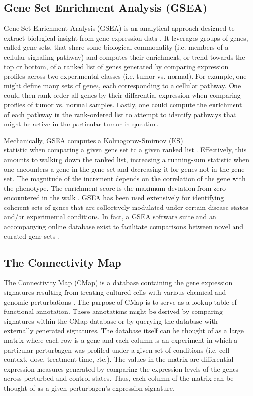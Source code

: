 \documentclass[12pt]{article}
\begin{document}
\subsection{Gene Set Enrichment Analysis (GSEA)}

Gene Set Enrichment Analysis (GSEA) is an analytical approach designed to extract biological insight from gene expression data \cite{subramanian_gene_2005}. It leverages  groups of genes, called gene sets, that share some biological commonality (i.e. members of a cellular signaling pathway) and computes their enrichment, or trend towards the top or bottom, of a ranked list of genes generated by comparing expression profiles across two experimental classes (i.e. tumor vs. normal). For example, one might define many sets of genes, each corresponding to a cellular pathway. One could then rank-order all genes by their differential expression when comparing profiles of tumor vs. normal samples. Lastly, one could compute the enrichment of each pathway in the rank-ordered list to attempt to identify pathways that might be active in the particular tumor in question.

Mechanically, GSEA computes a Kolmogorov-Smirnov (KS)\\
 statistic when comparing a given gene set to a given ranked list \cite{hollander_wolfe_1975}. Effectively, this amounts to walking down the ranked list, increasing a running-sum statistic when one encounters a gene in the gene set and decreasing it for genes not in the gene set. The magnitude of the increment depends on the correlation of the gene with the phenotype. The enrichment score is the maximum deviation from zero encountered in the walk \cite{subramanian_gene_2005}. GSEA has been used extensively for identifying coherent sets of genes that are collectively modulated under certain disease states and/or experimental conditions. In fact, a GSEA software suite and an accompanying online database exist to facilitate comparisons between novel and curated gene sets \cite{msigdb_website}.

\subsection{The Connectivity Map}

The Connectivity Map (CMap) is a database containing the gene expression signatures resulting from treating cultured cells with various chemical and genomic perturbations \cite{lamb_connectivity_2006}. The purpose of CMap is to serve as a lookup table of functional annotation. These annotations might be derived by comparing signatures within the CMap database or by querying the database with externally generated signatures. The database itself can be thought of as a large matrix where each row is a gene and each column is an experiment in which a particular perturbagen was profiled under a given set of conditions (i.e. cell context, dose, treatment time, etc.). The values in the matrix are differential expression measures generated by comparing the expression levels of the genes across perturbed and control states. Thus, each column of the matrix can be thought of as a given perturbagen's expression signature.
\end{document}
